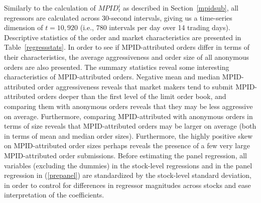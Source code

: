 \documentclass{article}
\begin{document}
Similarly to the calculation of $MPID_t^i$ as described in Section~\ref{mpidsub}, all regressors are calculated across 30-second intervals, giving us a time-series dimension of $t=10,920$ (i.e., 780 intervals per day over 14 trading days). Descriptive statistics of the order and market characteristics are presented in Table~\ref{regressstats}. In order to see if MPID-attributed orders differ in terms of their characteristics, the average aggressiveness and order size of all anonymous orders are also presented. The summary statistics reveal some interesting characteristics of MPID-attributed orders. Negative mean and median MPID-attributed order aggressiveness reveals that market makers tend to submit MPID-attributed orders deeper than the first level of the limit order book, and comparing them with anonymous orders reveals that they may be less aggressive on average. Furthermore, comparing MPID-attributed with anonymous orders in terms of size reveals that MPID-attributed orders may be larger on average (both in terms of mean and median order sizes). Furthermore, the highly positive skew on MPID-attributed order sizes perhaps reveals the presence of a few very large MPID-attributed order submissions. Before estimating the panel regression, all variables (excluding the dummies) in the stock-level regressions and in the panel regression in (\ref{prepanel}) are standardized by the stock-level standard deviation, in order to control for differences in regressor magnitudes across stocks and ease interpretation of the coefficients.
\end{document}
